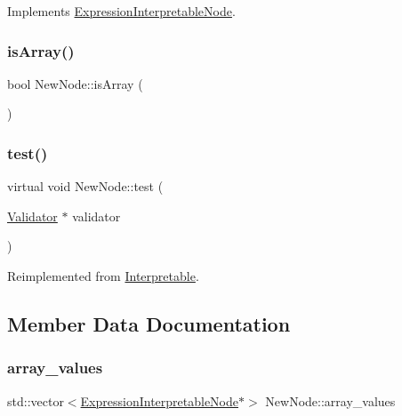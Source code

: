 Implements \hyperlink{classExpressionInterpretableNode_a43650f046c48fc539f77a207e3c9181e}{Expression\+Interpretable\+Node}.

\mbox{\label{classNewNode_af2d1614a80b8fcc00957155109e4b2f2}} 
\subsubsection{\texorpdfstring{is\+Array()}{isArray()}}
{\footnotesize\ttfamily bool New\+Node\+::is\+Array (\begin{DoxyParamCaption}{ }\end{DoxyParamCaption})}

\mbox{\label{classNewNode_a9be504d069e8a5d4ea13b4767a3c792a}} 
\subsubsection{\texorpdfstring{test()}{test()}}
{\footnotesize\ttfamily virtual void New\+Node\+::test (\begin{DoxyParamCaption}\item[{\hyperlink{classValidator}{Validator} $\ast$}]{validator }\end{DoxyParamCaption})\hspace{0.3cm}{\ttfamily [virtual]}}



Reimplemented from \hyperlink{classInterpretable_a32f547aaf68dcbab993284d3257ab010}{Interpretable}.



\subsection{Member Data Documentation}
\mbox{\label{classNewNode_afd78e7c3e05eb57a1536f705fb900fd5}} 
\subsubsection{\texorpdfstring{array\+\_\+values}{array\_values}}
{\footnotesize\ttfamily std\+::vector$<$\hyperlink{classExpressionInterpretableNode}{Expression\+Interpretable\+Node}$\ast$$>$ New\+Node\+::array\+\_\+values}

